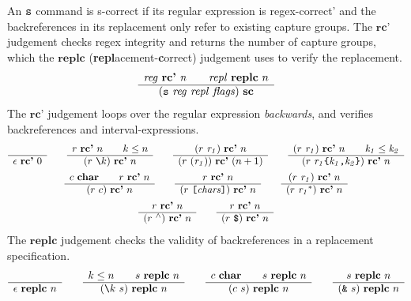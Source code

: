 \documentclass[11pt]{article}
\newcommand\RULE[3][]{\begin{array}{c} #2 \\ \hline #3 \end{array}}
\newcommand\J[1]{\ensuremath{\textbf{#1}}}
\newcommand\cmd[1]{\ensuremath{\text{\texttt{#1}}}}
\renewcommand\arg[1]{\ensuremath{\mathit{#1}}}
\newcommand\sanchor{\cmd{\ensuremath{{}^\land}}}
\newcommand\eanchor{\cmd{\$}}
\begin{document}
An \cmd{s} command is s-correct if its regular expression is regex-correct' and the backreferences in its replacement only refer to existing capture groups.
The \J{rc'} judgement checks regex integrity and returns the number of capture groups, which the \J{replc} (\textbf{repl}acement-\textbf{c}orrect) judgement uses to verify the replacement.
\begin{gather*}
	\RULE{\arg{reg}\ \J{rc'}\ \arg{n} \qquad \arg{repl}\ \J{replc}\ n}{(\cmd{s}\ \arg{reg}\ \arg{repl}\ \arg{flags})\ \J{sc}}
\end{gather*}
%
The \J{rc'} judgement loops over the regular expression \emph{backwards}, and verifies backreferences and interval-expressions.
\begin{gather*}
	\RULE{}{\epsilon\ \J{rc'}\ 0} \qquad
	\RULE{r\ \J{rc'}\ n \qquad k \leq n}{(r\ \cmd{\textbackslash} k)\ \J{rc'}\ n} \qquad
	\RULE{(r\ \arg{r_1})\ \J{rc'}\ n}{(r\ (\arg{r_1}))\ \J{rc'}\ (n + 1)} \qquad
	\RULE{(r\ \arg{r_1})\ \J{rc'}\ n \qquad \arg{k_1} \leq \arg{k_2}}{(r\ \arg{r_1}\cmd{\{}\arg{k_1}\cmd{,}\arg{k_2}\cmd{\}})\ \J{rc'}\ n} \\
	\RULE{c\ \J{char} \qquad r\ \J{rc'}\ n}{(r\ c)\ \J{rc'}\ n} \qquad
	\RULE{r\ \J{rc'}\ n}{(r\ \cmd{[} \arg{chars} \cmd{]})\ \J{rc'}\ n} \qquad
	\RULE{(r\ \arg{r_1})\ \J{rc'}\ n}{(r\ \arg{r_1}^*)\ \J{rc'}\ n} \\
	\RULE{r\ \J{rc'}\ n}{(r\ \sanchor)\ \J{rc'}\ n} \qquad
	\RULE{r\ \J{rc'}\ n}{(r\ \eanchor)\ \J{rc'}\ n}
\end{gather*}
%
The \J{replc} judgement checks the validity of backreferences in a replacement specification.
\begin{gather*}
	\RULE{}{\epsilon\ \J{replc}\ n} \qquad
	\RULE{k \leq n \qquad s\ \J{replc}\ n}{(\cmd{\textbackslash} k\ s)\ \J{replc}\ n} \qquad
	\RULE{c\ \J{char} \qquad s\ \J{replc}\ n}{(c\ s)\ \J{replc}\ n} \qquad
	\RULE{s\ \J{replc}\ n}{(\cmd{\&}\ s)\ \J{replc}\ n}
\end{gather*}
\end{document}
